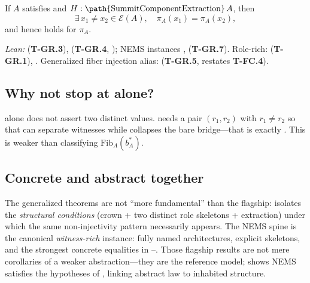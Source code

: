 \documentclass[11pt]{article}
\begin{document}
\begin{theorem}\label{thm:gen-refinement}
If $A$ satisfies  and $H : \text{\path{SummitComponentExtraction}}\,A$, then
\[
  \exists\, x_1 \neq x_2 \in \mathcal{E}(A),\quad \pi_A(x_1) = \pi_A(x_2),
\]
and hence  holds for $\pi_A$.
\end{theorem}

\begin{sloppypar}
\noindent\emph{Lean:}  (\textbf{T-GR.3}),  (\textbf{T-GR.4}, ); NEMS instances ,  (\textbf{T-GR.7}). Role-rich:  (\textbf{T-GR.1}), . Generalized fiber injection alias:  (\textbf{T-GR.5}, restates \textbf{T-FC.4}).
\end{sloppypar}

\subsection[Why not stop at CrownEligible alone?]{Why not stop at  alone?}\label{sec:flagship-why-not-crown}
 alone does not assert two distinct  values.  needs a pair $(r_1,r_2)$ with $r_1 \neq r_2$ so that  can separate witnesses while\linebreak
{} collapses the bare bridge---that is exactly . This is weaker than classifying $\mathrm{Fib}_A(b^\ast_A)$.

\subsection{Concrete and abstract together}\label{sec:flagship-concrete-abstract}
The generalized theorems are not ``more fundamental'' than the flagship:  isolates the \emph{structural conditions} (crown + two distinct role skeletons + extraction) under which the same non-injectivity pattern necessarily appears. The NEMS spine is the canonical \emph{witness-rich} instance: fully named architectures, explicit skeletons, and the strongest concrete equalities in --. Those flagship results are not mere corollaries of a weaker abstraction---they are the reference model;\linebreak
{} shows NEMS satisfies the hypotheses of , linking abstract law to inhabited structure.
\end{document}
